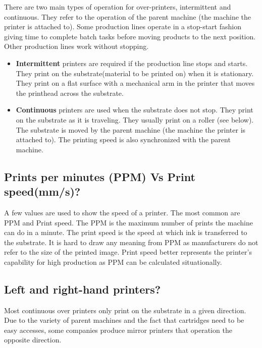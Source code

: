 There are two main types of operation for over-printers, intermittent and continuous. They refer to the operation of the parent machine (the machine the printer is attached to). Some production lines operate in a stop-start fashion giving time to complete batch tasks before moving products to the next position. Other production lines work without stopping.

\begin{itemize}
    \item \textbf{Intermittent} printers are required if the production line stops and starts. They print on the substrate(material to be printed on) when it is stationary. They print on a flat surface with a mechanical arm in the printer that moves the printhead across the substrate.
    \item \textbf{Continuous} printers are used when the substrate does not stop. They print on the substrate as it is traveling. They usually print on a roller (see below). The substrate is moved by the parent machine (the machine the printer is attached to). The printing speed is also synchronized with the parent machine.
\end{itemize}

\subsection{Prints per minutes (PPM) Vs Print speed(mm/s)?}

A few values are used to show the speed of a printer. The most common are PPM and Print speed. The PPM is the maximum number of prints the machine can do in a minute. The print speed is the speed at which ink is transferred to the substrate. It is hard to draw any meaning from PPM  as manufacturers do not refer to the size of the printed image. Print speed better represents the printer's capability for high production as PPM can be calculated situationally.


\subsection{Left and right-hand printers?}

Most continuous over printers only print on the substrate in a given direction. Due to the variety of parent machines and the fact that cartridges need to be easy accesses, some companies produce mirror printers that operation the opposite direction.
